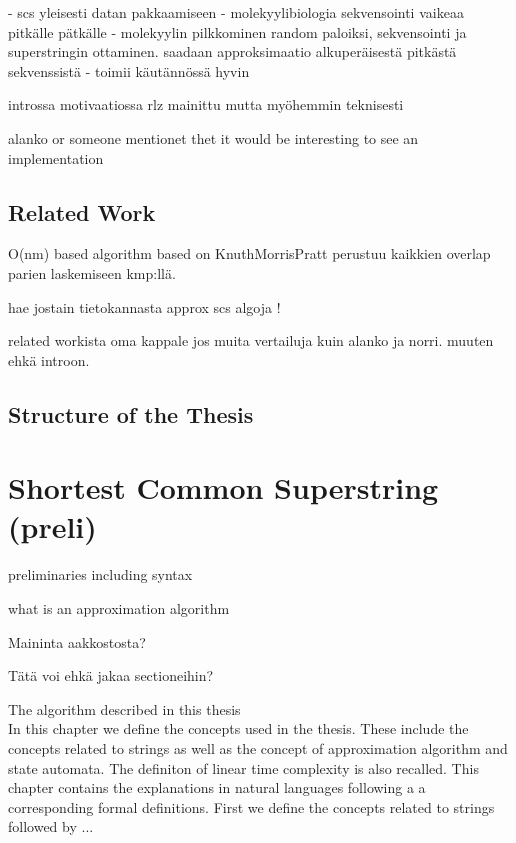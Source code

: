 \documentclass[english,twoside,censored,csm,algorithms-track-2020]{HYthesisML}
\theoremstyle{plain}
\theoremstyle{definition}
\begin{document}
  - scs yleisesti datan pakkaamiseen
  - molekyylibiologia sekvensointi vaikeaa pitkälle pätkälle
    - molekyylin pilkkominen random paloiksi, sekvensointi ja superstringin ottaminen.
      saadaan approksimaatio alkuperäisestä pitkästä sekvenssistä
    - toimii käutännössä hyvin \citep{Peltola83}
  

  introssa motivaatiossa rlz mainittu mutta myöhemmin teknisesti
  
  alanko or someone mentionet thet it would be interesting to see an implementation

  \section{Related Work}

  O(nm) based algorithm based on KnuthMorrisPratt \citep{Knuth77} \citep{Tarhio88}
  perustuu kaikkien overlap parien laskemiseen kmp:llä.

  hae jostain tietokannasta approx scs algoja !

  related workista oma kappale jos muita vertailuja kuin alanko ja norri. muuten ehkä introon.
  
  \section{Structure of the Thesis}

\chapter {Shortest Common Superstring (preli)}


preliminaries including syntax

what is an approximation algorithm

Maininta aakkostosta?

Tätä voi ehkä jakaa sectioneihin?

The algorithm described in this thesis \\[1in]



In this chapter we define the concepts used in the thesis. These include the concepts related to strings as well as the concept of approximation algorithm
and state automata. The definiton of linear time complexity is also recalled. This chapter contains the explanations in natural languages following a
a corresponding formal definitions. First we define the concepts related to strings followed by ...  \\[1in]
\end{document}
